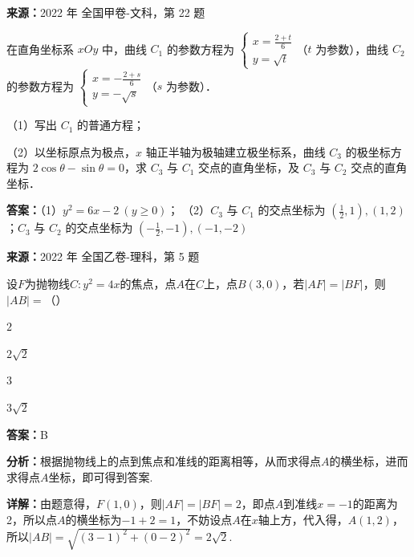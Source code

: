 \begin{question}[points=10]
\textbf{来源：}2022 年 全国甲卷-文科，第 22 题\par
[选修4-4：坐标系与参数方程]

在直角坐标系 $xOy$ 中，曲线 $C_1$ 的参数方程为 $\begin{cases} x=\frac{2+t}{6} \\ y=\sqrt{t} \end{cases}$（$t$ 为参数），曲线 $C_2$ 的参数方程为 $\begin{cases} x=-\frac{2+s}{6} \\ y=-\sqrt{s} \end{cases}$（$s$ 为参数）．

（1）写出 $C_1$ 的普通方程；

（2）以坐标原点为极点，$x$ 轴正半轴为极轴建立极坐标系，曲线 $C_3$ 的极坐标方程为 $2\cos\theta-\sin\theta=0$，求 $C_3$ 与 $C_1$ 交点的直角坐标，及 $C_3$ 与 $C_2$ 交点的直角坐标．
\begin{solution}
\textbf{答案：}（1）$y^2=6x-2\ (y\ge0)$；
（2）$C_3$ 与 $C_1$ 的交点坐标为 $(\frac{1}{2},1),(1,2)$；$C_3$ 与 $C_2$ 的交点坐标为 $(-\frac{1}{2},-1),(-1,-2)$
\end{solution}
\end{question}

\begin{question}[points=5]
\textbf{来源：}2022 年 全国乙卷-理科，第 5 题\par
设$F$为抛物线$C: y^2 = 4x$的焦点，点$A$在$C$上，点$B(3, 0)$，若$|AF| = |BF|$，则$|AB| =$（\qquad）
\begin{choices}
  \item $2$
  \item $2\sqrt{2}$
  \item $3$
  \item $3\sqrt{2}$
\end{choices}
\begin{solution}
\textbf{答案：}B

\textbf{分析：}根据抛物线上的点到焦点和准线的距离相等，从而求得点$A$的横坐标，进而求得点$A$坐标，即可得到答案.

\textbf{详解：}由题意得，$F(1,0)$，则$|AF| = |BF| = 2$，即点$A$到准线$x=-1$的距离为2，所以点$A$的横坐标为$-1+2=1$，不妨设点$A$在$x$轴上方，代入得，$A(1,2)$，所以$|AB| = \sqrt{(3-1)^2 + (0-2)^2} = 2\sqrt{2}$.
\end{solution}
\end{question}

